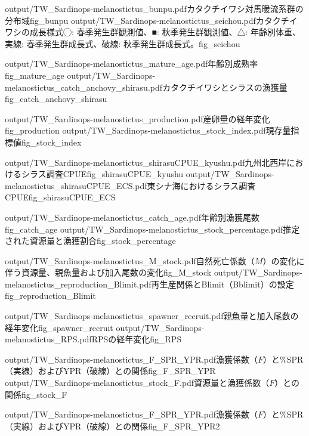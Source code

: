 \TwoOfSixFigs
{output/TW_Sardinops-melanostictus_bunpu.pdf}{カタクチイワシ対馬暖流系群の分布域}{fig_bunpu}
{output/TW_Sardinops-melanostictus_seichou.pdf}{カタクチイワシの成長様式\newline◯: 春季発生群観測値、■: 秋季発生群観測値、△: 年齢別体重、実線: 春季発生群成長式、破線: 秋季発生群成長式。}{fig_seichou}

\TwoOfSixFigs
{output/TW_Sardinops-melanostictus_mature_age.pdf}{年齢別成熟率}{fig_mature_age}
{output/TW_Sardinops-melanostictus_catch_anchovy_shirasu.pdf}{カタクチイワシとシラスの漁獲量}{fig_catch_anchovy_shirasu}

\TwoOfSixFigs
{output/TW_Sardinops-melanostictus_production.pdf}{産卵量の経年変化}{fig_production}
{output/TW_Sardinops-melanostictus_stock_index.pdf}{現存量指標値}{fig_stock_index}

\TwoOfSixFigs
{output/TW_Sardinops-melanostictus_shirasuCPUE_kyushu.pdf}{九州北西岸におけるシラス調査CPUE}{fig_shirasuCPUE_kyushu}
{output/TW_Sardinops-melanostictus_shirasuCPUE_ECS.pdf}{東シナ海におけるシラス調査CPUE}{fig_shirasuCPUE_ECS}

\TwoOfSixFigs
{output/TW_Sardinops-melanostictus_catch_age.pdf}{年齢別漁獲尾数}{fig_catch_age}
{output/TW_Sardinops-melanostictus_stock_percentage.pdf}{推定された資源量と漁獲割合}{fig_stock_percentage}

\TwoOfSixFigs
{output/TW_Sardinops-melanostictus_M_stock.pdf}{自然死亡係数（$M$）の変化に伴う資源量、親魚量および加入尾数の変化}{fig_M_stock}
{output/TW_Sardinops-melanostictus_reproduction_Blimit.pdf}{再生産関係とBlimit（Bblimit）の設定}{fig_reproduction_Blimit}

\TwoOfSixFigs
{output/TW_Sardinops-melanostictus_spawner_recruit.pdf}{親魚量と加入尾数の経年変化}{fig_spawner_recruit}
{output/TW_Sardinops-melanostictus_RPS.pdf}{RPSの経年変化}{fig_RPS}

\TwoOfSixFigs
{output/TW_Sardinops-melanostictus_F_SPR_YPR.pdf}{漁獲係数（$F$）と\%SPR（実線）およびYPR（破線）との関係}{fig_F_SPR_YPR}
{output/TW_Sardinops-melanostictus_stock_F.pdf}{資源量と漁獲係数（$F$）との関係}{fig_stock_F}

\OneOfSixFigs
{output/TW_Sardinops-melanostictus_F_SPR_YPR.pdf}{漁獲係数（$F$）と\%SPR（実線）およびYPR（破線）との関係}{fig_F_SPR_YPR2}
